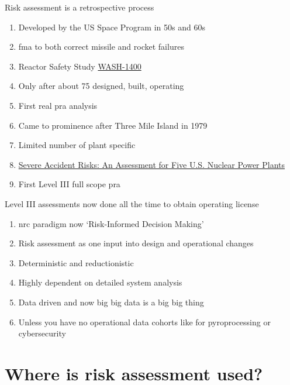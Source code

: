 \documentclass[aspectratio=1610,pdftex,dvipsnames,compress,xcolor={dvipsnames}]{beamer}
\newcommand{\acf}{\acrfull} %
\newcommand{\acs}{\acrshort} %
\newcommand{\acsp}{\acrshortpl} %
\begin{document}
\begin{frame}{Risk assessment is a retrospective process}
    \begin{enumerate}[series=outerlist,topsep=0pt,itemsep=11pt,leftmargin=*,label=(\arabic*)]
        \item[]Developed by the US Space Program in 50s and 60s
        \item[]\acf{fma} to both correct missile and rocket failures
        \item[]Reactor Safety Study \href{https://uidaho.pressbooks.pub/riskassessment/chapter/pra-2/}{WASH-1400}
        \item[]Only after about 75 \acsp{npp} designed, built, operating
        \item[]First real \acs{pra} analysis
        \item[]Came to prominence after Three Mile Island in 1979
        \item[]Limited number of plant specific \acsp{pra}
        \item[]\href{https://www.nrc.gov/reading-rm/doc-collections/nuregs/staff/sr1150/}{Severe Accident Risks: An Assessment for Five U.S. Nuclear Power Plants}
        \item[]First Level III full scope \acs{pra}
    \end{enumerate}
\end{frame}


\begin{frame}{Level III assessments now done all the time to obtain operating license}
    \begin{enumerate}[series=outerlist,topsep=0pt,itemsep=15pt,leftmargin=*,label=(\arabic*)]
        \item[]\acs{nrc} paradigm now `Risk-Informed Decision Making'
        \item[]Risk assessment as one input into design and operational changes
        \item[]Deterministic and reductionistic
        \item[]Highly dependent on detailed system analysis
        \item[]Data driven and now big big data is a big big thing 
        \item[]Unless you have no operational data cohorts like for pyroprocessing or cybersecurity
    \end{enumerate}
\end{frame}


\section{Where is risk assessment used?}
\end{document}
